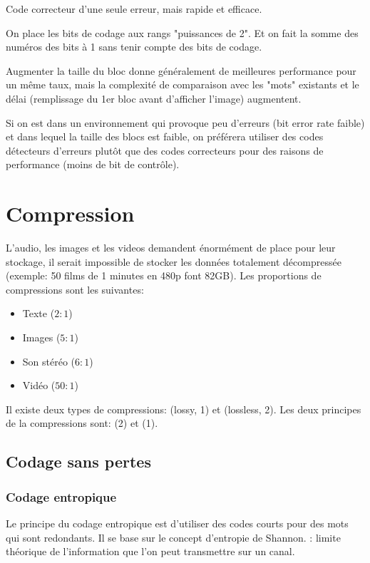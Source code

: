 Code correcteur d'une seule erreur, mais rapide et efficace.

On place les bits de codage aux rangs "puissances de 2". Et on fait la somme des numéros des bits à 1 sans tenir compte des bits de codage.

Augmenter la taille du bloc donne généralement de meilleures performance pour un même taux, mais la complexité de comparaison avec les "mots" existants et le délai (remplissage du 1er bloc avant d'afficher l'image) augmentent.

Si on est dans un environnement qui provoque peu d'erreurs (bit error rate faible) et dans lequel la taille des blocs est faible, on préférera utiliser des codes détecteurs d'erreurs plutôt que des codes correcteurs pour des raisons de performance (moins de bit de contrôle).

\chapter{Compression}

L'audio, les images et les videos demandent énormément de place pour leur stockage, il serait impossible de stocker les données totalement décompressée (exemple: 50 films de 1 minutes en 480p font 82GB). Les proportions de compressions sont les suivantes:
\begin{itemize}
\item Texte ($2:1$)
\item Images ($5:1$)
\item Son stéréo ($6:1$)
\item Vidéo ($50:1$)
\end{itemize}

Il existe deux types de compressions:  (lossy, 1) et  (lossless, 2). Les deux principes de la compressions sont:  (2) et  (1).

\section{Codage sans pertes}

\subsection{Codage entropique}

Le principe du codage entropique est d'utiliser des codes courts pour des mots qui sont redondants. Il se base sur le concept d'entropie de Shannon.
 : limite théorique de l'information que l'on peut transmettre sur un canal.

